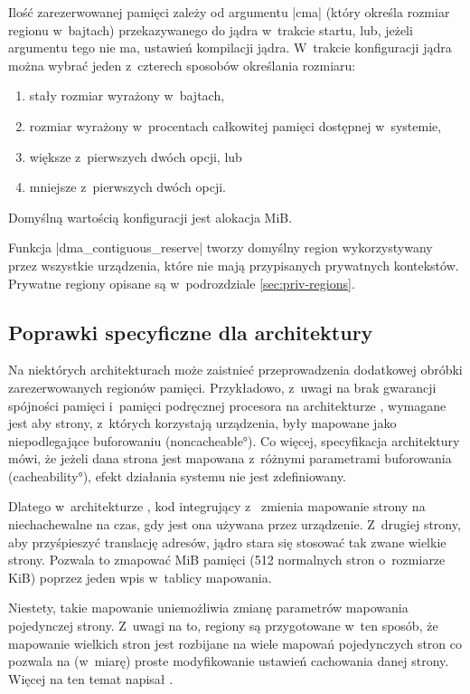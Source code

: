 Ilość zarezerwowanej pamięci zależy od argumentu \code|cma| (który
określa rozmiar regionu w~bajtach) przekazywanego do jądra w~trakcie
startu, lub, jeżeli argumentu tego nie ma, ustawień kompilacji jądra.
W~trakcie konfiguracji jądra można wybrać jeden z~czterech sposobów
określania rozmiaru:

\begin{enumerate}
\item stały rozmiar wyrażony w~bajtach,
\item rozmiar wyrażony w~procentach całkowitej pamięci dostępnej
  w~systemie,
\item większe z~pierwszych dwóch opcji, lub
\item mniejsze z~pierwszych dwóch opcji.
\end{enumerate}

Domyślną wartością konfiguracji jest alokacja \unit[16]{MiB}.

Funkcja \code|dma_contiguous_reserve| tworzy domyślny region 
wykorzystywany przez wszystkie urządzenia, które nie mają przypisanych
prywatnych kontekstów.  Prywatne regiony opisane są w~podrozdziale
\ref{sec:priv-regions}.


\subsection{Poprawki specyficzne dla architektury}

Na niektórych architekturach może zaistnieć przeprowadzenia dodatkowej
obróbki zarezerwowanych regionów pamięci.  Przykładowo, z~uwagi na
brak gwarancji spójności pamięci  i~pamięci podręcznej procesora na
architekturze  \autocite[podrozdział B5.5]{bib:arm-arch-reference},
wymagane jest aby strony, z~których korzystają urządzenia, były
mapowane jako niepodlegające buforowaniu (\ang{noncacheable}).  Co
więcej, specyfikacja architektury mówi, że jeżeli dana strona jest
mapowana z~różnymi parametrami buforowania (\ang{cacheability}), efekt
działania systemu nie jest zdefiniowany.

Dlatego w~architekturze , kod integrujący  z~  zmienia
mapowanie strony na niechachewalne na czas, gdy jest ona używana przez
urządzenie.  Z~drugiej strony, aby przyśpieszyć translację adresów,
jądro stara się stosować tak zwane wielkie strony.  Pozwala to
zmapować \unit[2]{MiB} pamięci (512 normalnych stron o~rozmiarze
\unit[4]{KiB}) poprzez jeden wpis w~tablicy mapowania.

Niestety, takie mapowanie uniemożliwia zmianę parametrów mapowania
pojedynczej strony.  Z~uwagi na to, regiony  są przygotowane w~ten
sposób, że mapowanie wielkich stron jest rozbijane na wiele mapowań
pojedynczych stron co pozwala na (w~miarę) proste modyfikowanie
ustawień cachowania danej strony.  Więcej na ten temat napisał
\textcite{bib:cma-and-arm}.

